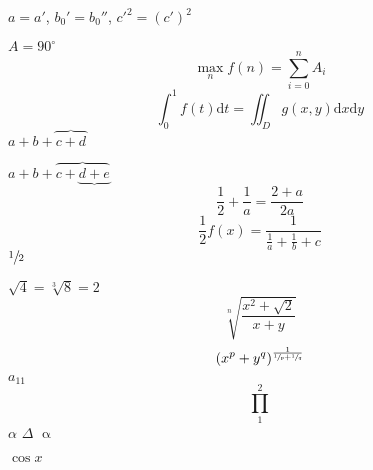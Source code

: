 \documentclass{article}
\newcommand{\degree}{^\circ}
\begin{document}
$a = a'$, $b_0' = b_0''$, ${c'}^2 = (c')^2$

$A = 90 \degree$
\begin{equation}
\max_n f(n) = \sum_{i = 0}^n A_i
\end{equation}
\begin{equation}
\int_0^1 f(t) \mathrm{d} t = \iint_D g(x,y) \mathrm{d} x \mathrm{d} y
\end{equation}
$a+b+\overbrace{c+d}$

$a+b+\overbrace{c+\underbrace{d+e}}$
\begin{equation}
\frac{1}{2} + \frac{1}{a} = \frac{2+a}{2a}
\end{equation}
\begin{equation}
\frac{1}{2}f(x) = \frac{1}{\frac{1}{a}+\frac{1}{b}+c}
\end{equation}
$\sfrac{1}{2}$

$\sqrt 4 = \sqrt[3]{8} = 2$
\begin{equation}
\sqrt[n]{\frac{x^2 + \sqrt{2}}{x+y}}
\end{equation}
\begin{equation}
(x^p + y^q)^{\frac{1}{\sfrac{1}{p} + \sfrac{1}{q}}}
\end{equation}
$a_11$
\begin{equation}
\prod_1^2
\end{equation}
$\alpha$
$\Delta$
$\upalpha$

$\cos x$
\end{document}
